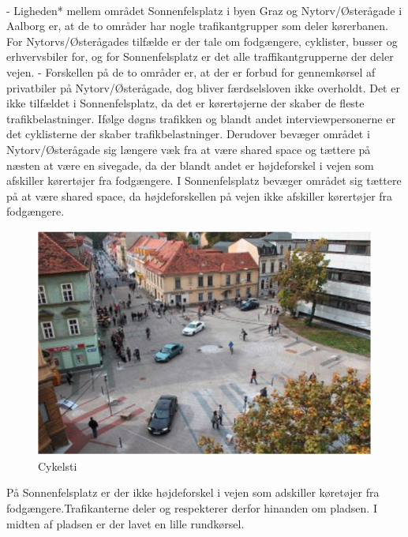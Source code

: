 \\

-	Ligheden* mellem området Sonnenfelsplatz i byen Graz og Nytorv/Østerågade i Aalborg er, at de to områder har nogle trafikantgrupper som deler kørerbanen. For Nytorvs/Østerågades tilfælde er der tale om fodgængere, cyklister, busser og erhvervsbiler for, og for Sonnenfelsplatz er det alle traffikantgrupperne der deler vejen.
-	Forskellen på de to områder er, at der er forbud for gennemkørsel af privatbiler på Nytorv/Østerågade, dog bliver færdselsloven ikke overholdt. Det er ikke tilfældet i Sonnenfelsplatz, da det er kørertøjerne der skaber de fleste trafikbelastninger. Ifølge døgns trafikken og blandt andet interviewpersonerne er det cyklisterne der skaber trafikbelastninger. Derudover bevæger området i Nytorv/Østerågade sig længere væk fra at være shared space og tættere på næsten at være en sivegade, da der blandt andet er højdeforskel i vejen som afskiller kørertøjer fra fodgængere. I Sonnenfelsplatz bevæger området sig tættere på at være shared space, da højdeforskellen på vejen ikke afskiller kørertøjer fra fodgængere. 

 \begin{figure}[htbp]
   \centering
   \begin{adjustbox}{max width=\textwidth}
     \includegraphics{figures/Billederogfigur/Perspektivering/en_andne_by.png}
  \end{adjustbox}
   \caption{Cykelsti}
    \label{fig:cykelsti}
 \end{figure}
 På Sonnenfelsplatz er der ikke højdeforskel i vejen som adskiller køretøjer fra fodgængere.Trafikanterne deler og respekterer derfor hinanden om pladsen. I midten af pladsen er der lavet en lille rundkørsel.%


